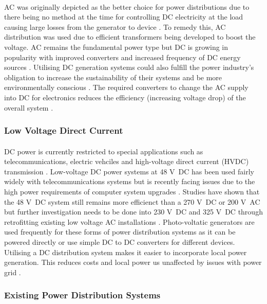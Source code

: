 \paragraph{}
AC was originally depicted as the better choice for power distributions due to there
being no method at the time for controlling DC electricity at the load causing large
losses from the generator to device \cite{Starke2008b}. To remedy this, AC distribution was used
due to efficient transformers being developed to boost the voltage. AC remains the
fundamental power type but DC is growing in popularity with improved converters and
increased frequency of DC energy sources \cite{Starke2008b}. Utilising DC generation systems could
also fulfill the power industry's obligation to increase the sustainability of their systems
and be more environmentally conscious \cite{Starke2008a}. The required converters to change the AC
supply into DC for electronics reduces the efficiency (increasing voltage drop) of the
overall system \cite{Starke2008b}.    

\subsubsection{Low Voltage Direct Current}

\paragraph{}
DC power is currently restricted to special applications such as telecommunications, electric vehciles and high-voltage direct current (HVDC) transmission \cite{Salomonsson2007}. Low-voltage DC power systems at 48 \si{V DC} has been used fairly widely with telecommunications systems but is recently facing issues due to the high power requirements of computer system upgrades \cite{Salomonsson2007}. Studies have shown that the 48 \si{V DC} system still remains more efficienct than a 270 \si{V DC} or 200 \si{V AC} but further investigation needs to be done into 230 \si{V DC} and 325 \si{V DC} through retrofitting existing low voltage AC installations \cite{Salomonsson2007}. Photo-voltatic generators are used frequently for these forms of power distribution systems as it can be powered directly or use simple DC to DC converters for different devices. Utilising a DC distribution system makes it easier to incorporate local power generation. This reduces costs and local power us unaffected by issues with power grid \cite{Starke2008a}. 

\subsubsection{Existing Power Distribution Systems}

